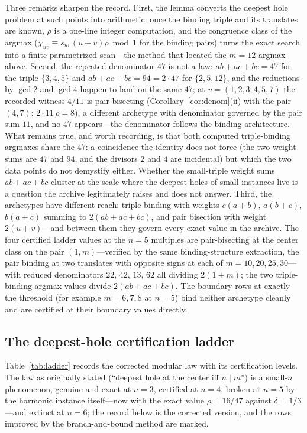 \documentclass[11pt,a4paper]{article}
\numberwithin{equation}{section}
\theoremstyle{plain}
\theoremstyle{definition}
\theoremstyle{remark}
\begin{document}
Three remarks sharpen the record. First, the lemma converts the deepest
hole problem at such points into arithmetic: once the binding triple
and its translates are known, $\rho$ is a one-line integer computation,
and the congruence class of the argmax
($\chi_{uv}\equiv s_{uv}(u{+}v)\rho \bmod 1$ for the binding pairs)
turns the exact search into a finite parametrized scan---the method
that located the $m=12$ argmax above. Second, the repeated denominator
$47$ is not a law: $ab+ac+bc=47$ for the triple $\{3,4,5\}$ and
$ab+ac+bc=94=2\cdot47$ for $\{2,5,12\}$, and the reductions by
$\gcd 2$ and $\gcd 4$ happen to land on the same $47$; at
$v=(1,2,3,4,5,7)$ the recorded witness $4/11$ is pair-bisecting
(Corollary~\ref{cor:denom}(ii) with the pair $(4,7)$:
$2\cdot11\,\rho=8$), a different archetype with denominator governed by
the pair sum $11$, and no $47$ appears---the denominator follows the
binding architecture. What remains true, and worth recording, is that
both computed triple-binding argmaxes share the $47$: a coincidence
the identity does not force (the two weight sums are $47$ and $94$, and
the divisors $2$ and $4$ are incidental) but which the two data points
do not demystify either. Whether the small-triple weight sums
$ab+ac+bc$ cluster at the scale where the deepest holes of small
instances live is a question the archive legitimately raises and does
not answer. Third, the
archetypes have different reach: triple binding with weights
$c(a{+}b)$, $a(b{+}c)$, $b(a{+}c)$ summing to $2(ab{+}ac{+}bc)$, and
pair bisection with weight $2(u{+}v)$---and between them they govern
every exact value in the archive. The four certified ladder values at
the $n=5$ multiples are pair-bisecting at the center class on the pair
$(1,m)$---verified by the same binding-structure extraction, the pair
binding at two translates with opposite signs at each of
$m=10,20,25,30$---with reduced denominators $22$, $42$, $13$, $62$ all
dividing $2(1{+}m)$; the two triple-binding argmax values divide
$2(ab{+}ac{+}bc)$. The boundary rows at exactly the
threshold (for example $m=6,7,8$ at $n=5$) bind neither archetype
cleanly and are certified at their boundary values directly.

\subsection{The deepest-hole certification ladder}

Table~\ref{tab:ladder} records the corrected modular law with its
certification levels. The law as originally stated (``deepest hole at
the center iff $n\mid m$'') is a small-$n$ phenomenon, genuine and exact
at $n=3$, certified at $n=4$, broken at $n=5$ by the harmonic instance
itself---now with the exact value $\rho=16/47$ against
$\delta=1/3$---and extinct at $n=6$; the record below is the corrected
version, and the rows improved by the branch-and-bound method are
marked.
\end{document}
